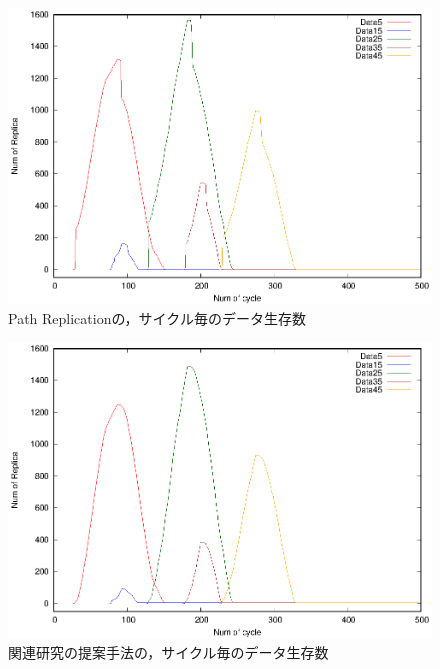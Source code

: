 \documentclass[11pt]{jreport}
\begin{document}
\begin{figure}[H]
	\begin{center}
		\includegraphics[width=15.0cm]{./figure/path_counter.eps}
	\end{center}
	\caption{Path Replicationの，サイクル毎のデータ生存数}
	\label{fig:path_c}
\end{figure}

\begin{figure}[H]
	\begin{center}
		\includegraphics[width=15.0cm]{./figure/relate_counter.eps}
	\end{center}
	\caption{関連研究の提案手法の，サイクル毎のデータ生存数}
	\label{fig:relate_c}
\end{figure}
\end{document}
